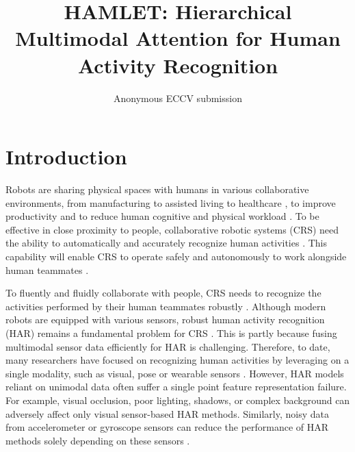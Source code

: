 \documentclass[runningheads]{llncs}
\title{HAMLET: Hierarchical Multimodal Attention for Human Activity Recognition
}
\author{Anonymous ECCV submission}
\institute{Paper ID \ECCVSubNumber}
\begin{document}
\pagestyle{headings}
\mainmatter
\def\ECCVSubNumber{100}  


\maketitle
\thispagestyle{empty}
\pagestyle{empty}

\begin{abstract}


\end{abstract}


\section{Introduction}
\label{sec:introduction}


Robots are sharing physical spaces with humans in various collaborative environments, from manufacturing to assisted living to healthcare \cite{Riek2017HealthCare,iqbal2019human,Iqbal2016T-RO}, to improve productivity and to reduce human cognitive and physical workload \cite{andi_iros}. To be effective in close proximity to people, collaborative robotic systems (CRS) need the ability to automatically and accurately recognize human activities \cite{fosapt}. This capability will enable CRS to operate safely and autonomously to work alongside human teammates \cite{iqbal2017coordination}.

To fluently and fluidly collaborate with people, CRS needs to recognize the activities performed by their human teammates robustly \cite{tiqbal_joint_action,Iqbal2015TAC,mit_ucsd}. Although modern robots are equipped with various sensors, robust human activity recognition (HAR) remains a fundamental problem for CRS \cite{iqbal2019human}. This is partly because fusing multimodal sensor data efficiently for HAR is challenging. Therefore, to date, many researchers have focused on recognizing human activities by leveraging on a single modality, such as visual, pose or wearable sensors \cite{andi_iros,new_sk_rep,st_graph_sk,space_time_sk_review,iqbal2016tempo}. However, HAR models reliant on unimodal data often suffer a single point feature representation failure. For example, visual occlusion, poor lighting, shadows, or complex background can adversely affect only visual sensor-based HAR methods. Similarly, noisy data from accelerometer or gyroscope sensors can reduce the performance of HAR methods solely depending on these sensors \cite{mit_ucsd,multimodal_survey}. 
\end{document}
